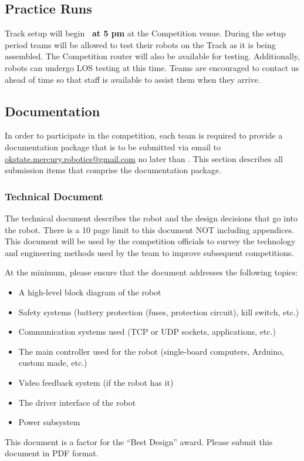 \subsection{Practice Runs}
Track setup will begin \textbf{\los \ at 5 pm} at the Competition venue. During the setup period teams will be allowed to test their robots on the Track as it is being assembled. The Competition router will also be available for testing. Additionally, robots can undergo LOS testing at this time. Teams are encouraged to contact us ahead of time so that staff is available to assist them when they arrive.

\subsection{Documentation}
In order to participate in the competition, each team is required to provide a documentation package that is to be submitted via email to \href{mailto:okstate.mercury.robotics@gmail.com}{ okstate.mercury.robotics@gmail.com} no later than \textbf{\documentation}. This section describes all submission items that comprise the documentation package.

\subsubsection{Technical Document}
The technical document describes the robot and the design decisions that go into the robot. There is a 10 page limit to this document NOT including appendices. This document will be used by the competition officials to survey the technology and engineering methods used by the team to improve subsequent competitions. 

At the minimum, please ensure that the document addresses the following topics:

\begin{itemize}
\item A high-level block diagram of the robot 
\item Safety systems (battery protection (fuses, protection circuit), kill switch, etc.)
\item Communication systems used (TCP or UDP sockets, applications, etc.)
\item The main controller used for the robot (single-board computers, Arduino, custom made, etc.)
\item Video feedback system (if the robot has it)
\item The driver interface of the robot
\item Power subsystem	
\end{itemize}
This document is a factor for the “Best Design” award. Please submit this document in PDF format.
